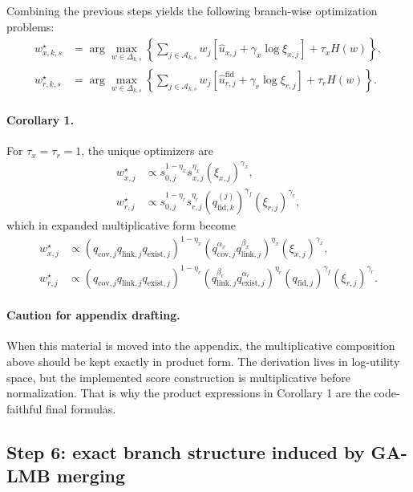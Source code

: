 Combining the previous steps yields the following branch-wise optimization problems:
\begin{align}
w_{x,k,s}^\star
&=
\arg\max_{w \in \Delta_{k,s}}
\left\{
\sum_{j \in \mathcal{A}_{k,s}} w_j \left[\hat u_{x,j} + \gamma_x \log \xi_{x,j}\right]
+
\tau_x H(w)
\right\},
\\
w_{r,k,s}^\star
&=
\arg\max_{w \in \Delta_{k,s}}
\left\{
\sum_{j \in \mathcal{A}_{k,s}} w_j \left[\hat u_{r,j}^{\mathrm{fid}} + \gamma_r \log \xi_{r,j}\right]
+
\tau_r H(w)
\right\}.
\end{align}

\paragraph{Corollary 1.}
For $\tau_x = \tau_r = 1$, the unique optimizers are
\begin{align}
w_{x,j}^\star
&\propto
s_{0,j}^{1-\eta_x}
s_{x,j}^{\eta_x}
\left(\xi_{x,j}\right)^{\gamma_x},
\\
w_{r,j}^\star
&\propto
s_{0,j}^{1-\eta_r}
s_{r,j}^{\eta_r}
\left(q_{\mathrm{fid},k}^{(j)}\right)^{\gamma_f}
\left(\xi_{r,j}\right)^{\gamma_r},
\end{align}
which in expanded multiplicative form become
\begin{align}
w_{x,j}^\star
&\propto
\left(q_{\mathrm{cov},j} q_{\mathrm{link},j} q_{\mathrm{exist},j}\right)^{1-\eta_x}
\left(q_{\mathrm{cov},j}^{\alpha_x} q_{\mathrm{link},j}^{\beta_x}\right)^{\eta_x}
\left(\xi_{x,j}\right)^{\gamma_x},
\\
w_{r,j}^\star
&\propto
\left(q_{\mathrm{cov},j} q_{\mathrm{link},j} q_{\mathrm{exist},j}\right)^{1-\eta_r}
\left(q_{\mathrm{link},j}^{\beta_r} q_{\mathrm{exist},j}^{\alpha_r}\right)^{\eta_r}
\left(q_{\mathrm{fid},j}\right)^{\gamma_f}
\left(\xi_{r,j}\right)^{\gamma_r}.
\end{align}

\paragraph{Caution for appendix drafting.}
When this material is moved into the appendix, the multiplicative composition above should be kept exactly in product form. The derivation lives in log-utility space, but the implemented score construction is multiplicative before normalization. That is why the product expressions in Corollary 1 are the code-faithful final formulas.

\subsection*{Step 6: exact branch structure induced by GA-LMB merging}

